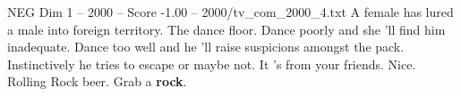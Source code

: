 \begin{textsample}{NEG Dim 1 – 2000 – Score -1.00 – 2000/tv\_com\_2000\_4.txt}  \label{ex:f1_neg_028}
A female has lured a male into foreign territory.
The dance floor.
Dance poorly and she 'll find him inadequate.
Dance too well and he 'll raise suspicions amongst the pack.
Instinctively he tries to escape or maybe not.
It 's from your friends.
Nice.
Rolling Rock beer.
Grab a \textbf{rock}.

\end{textsample}
